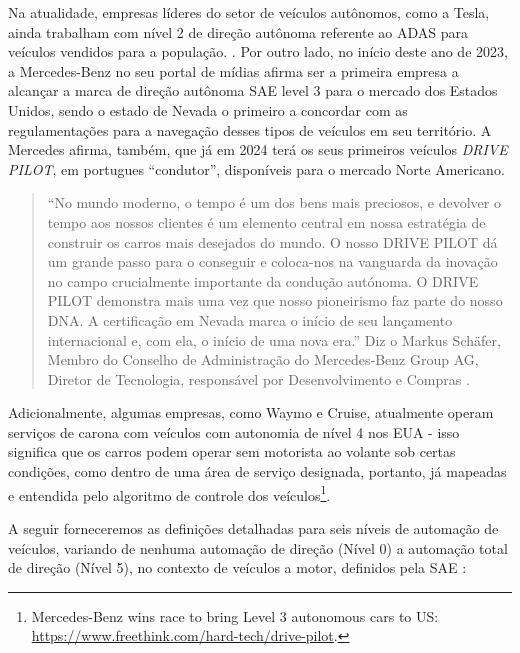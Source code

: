 Na atualidade, empresas líderes do setor de veículos autônomos, como a Tesla, ainda trabalham com nível 2 de direção autônoma referente ao ADAS para veículos vendidos para a população. \cite{4cenarios_ocidental}.
Por outro lado, no início deste ano de 2023, a Mercedes-Benz no seu portal de mídias afirma ser a primeira empresa a alcançar a marca de direção autônoma SAE level 3 para o mercado dos Estados Unidos, sendo o estado de Nevada o primeiro a concordar com as regulamentações para a navegação desses tipos de veículos em seu território. A Mercedes afirma, também, que já em 2024 terá os seus primeiros veículos \textit{DRIVE PILOT}, em portugues “condutor”, disponíveis para o mercado Norte Americano.

\begin{quote}
“No mundo moderno, o tempo é um dos bens mais preciosos, e devolver o tempo aos nossos clientes é um elemento central em nossa estratégia de construir os carros mais desejados do mundo. O nosso DRIVE PILOT dá um grande passo para o conseguir e coloca-nos na vanguarda da inovação no campo crucialmente importante da condução autónoma. O DRIVE PILOT demonstra mais uma vez que nosso pioneirismo faz parte do nosso DNA. A certificação em Nevada marca o início de seu lançamento internacional e, com ela, o início de uma nova era.”
Diz o Markus Schäfer, Membro do Conselho de Administração do Mercedes‑Benz Group AG, Diretor de Tecnologia, responsável por Desenvolvimento e Compras \cite{mercedes3}.
\end{quote}

Adicionalmente, algumas empresas, como Waymo e Cruise, atualmente operam serviços de carona com veículos com autonomia de nível 4 nos EUA - isso significa que os carros podem operar sem motorista ao volante sob certas condições, como dentro de uma área de serviço designada, portanto, já mapeadas e entendida pelo algoritmo de controle dos veículos\footnote{Mercedes-Benz wins race to bring Level 3 autonomous cars to US: \url{https://www.freethink.com/hard-tech/drive-pilot}.}.



A seguir forneceremos as definições detalhadas para seis níveis de automação de veículos, variando de nenhuma automação de direção (Nível 0) a automação total de direção (Nível 5), no contexto de veículos a motor, definidos pela SAE \cite{SAE}:

